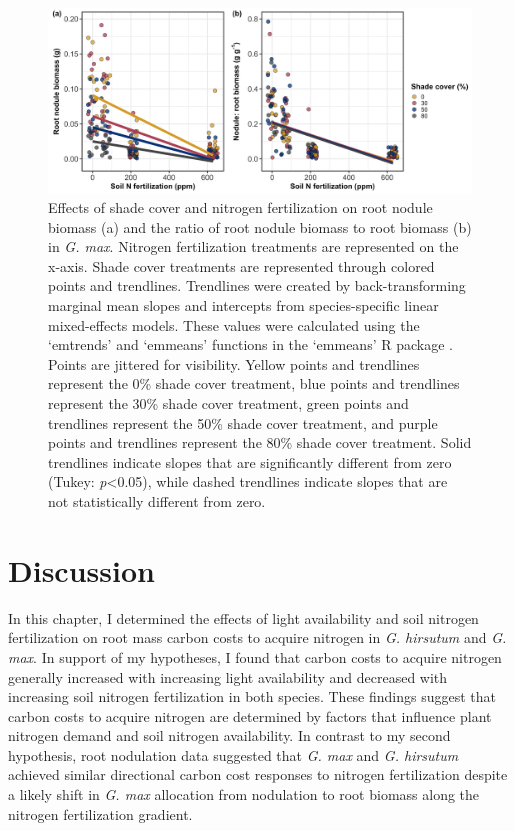 \newpage
\begin{landscape}

\begin{figure}
    \centering
    \includegraphics[scale = 1]{ch2_LxN_Greenhouse/figs/fig4_nodwgt.png}
    \caption[Effects of shade cover and nitrogen fertilization on root nodule biomass and the ratio of root nodule biomass to root biomass in \textit{G. max}.]{Effects of shade cover and nitrogen fertilization on root nodule biomass (a) and the ratio of root nodule biomass to root biomass (b) in \textit{G. max}. Nitrogen fertilization treatments are represented on the x-axis. Shade cover treatments are represented through colored points and trendlines. Trendlines were created by back-transforming marginal mean slopes and intercepts from species-specific linear mixed-effects models. These values were calculated using the ‘emtrends’ and ‘emmeans’ functions in the ‘emmeans’ R package . Points are jittered for visibility. Yellow points and trendlines represent the 0\% shade cover treatment, blue points and trendlines represent the 30\% shade cover treatment, green points and trendlines represent the 50\% shade cover treatment, and purple points and trendlines represent the 80\% shade cover treatment. Solid trendlines indicate slopes that are significantly different from zero (Tukey: \textit{p}<0.05), while dashed trendlines indicate slopes that are not statistically different from zero.}
    \label{fig:figure2.4}
\end{figure}
\end{landscape}
\clearpage

\section{Discussion}
\noindent In this chapter, I determined the effects of light availability and soil nitrogen fertilization on root mass carbon costs to acquire nitrogen in \textit{G. hirsutum} and \textit{G. max}. In support of my hypotheses, I found that carbon costs to acquire nitrogen generally increased with increasing light availability and decreased with increasing soil nitrogen fertilization in both species. These findings suggest that carbon costs to acquire nitrogen are determined by factors that influence plant nitrogen demand and soil nitrogen availability. In contrast to my second hypothesis, root nodulation data suggested that \textit{G. max} and \textit{G. hirsutum} achieved similar directional carbon cost responses to nitrogen fertilization despite a likely shift in \textit{G. max} allocation from nodulation to root biomass along the nitrogen fertilization gradient.

